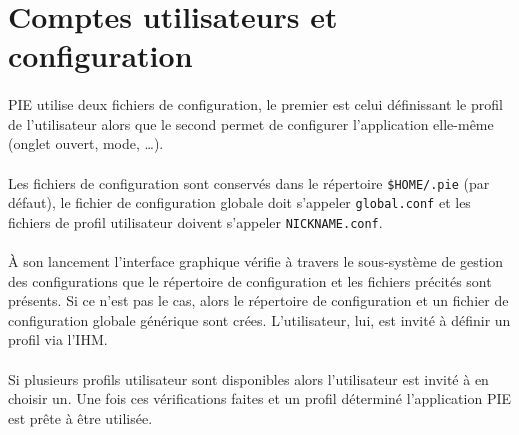 \section{Comptes utilisateurs et configuration}

\paragraph{}

PIE utilise deux fichiers de configuration, le premier est celui définissant le profil de l'utilisateur
alors que le second permet de configurer l'application elle-même (onglet ouvert, mode, \ldots).


\paragraph{}

Les fichiers de configuration sont conservés dans le répertoire \texttt{\$HOME/.pie} (par défaut), le fichier
de configuration globale doit s'appeler \texttt{global.conf} et les fichiers de profil utilisateur doivent
s'appeler \texttt{NICKNAME.conf}.


\paragraph{}

À son lancement l'interface graphique vérifie à travers le sous-système de gestion des configurations
que le répertoire de configuration et les fichiers précités sont présents. Si ce n'est pas le cas, alors le
répertoire de configuration et un fichier de configuration globale générique sont crées. L'utilisateur, lui,
est invité à définir un profil via l'IHM.


\paragraph{}

Si plusieurs profils utilisateur sont disponibles alors l'utilisateur est invité à en choisir un. Une fois ces
vérifications faites et un profil déterminé l'application PIE est prête à être utilisée.

